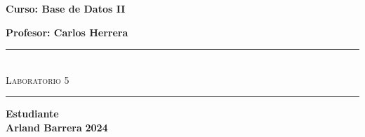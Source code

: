 \begin{titlepage}
\begin{center}
      {\Large \textbf{Curso: Base de Datos II}}\medskip
      
      {\Large \textbf{Profesor: Carlos Herrera}}

      \rule{\linewidth}{0.75mm}\\
          {\Large \textsc{Laboratorio 5}} 
      \rule{\linewidth}{0.75mm}\medskip

      {\Large \textbf{Estudiante}}\\
      \vspace{5mm}
      {\Large \textbf{Arland Barrera}}
      \vfill
      {\Huge \textbf{2024}}

  \end{center}
\end{titlepage}